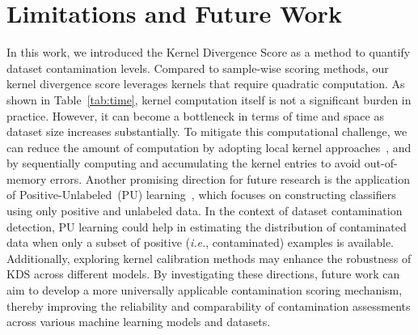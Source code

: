 \section{Limitations and Future Work}
\label{apdx:limits}

In this work, we introduced the Kernel Divergence Score as a method to quantify dataset contamination levels. Compared to sample-wise scoring methods, our kernel divergence score leverages kernels that require quadratic computation. 
As shown in Table~\ref{tab:time}, kernel computation itself is not a significant burden in practice.
However, it can become a bottleneck in terms of time and space as dataset size increases substantially. 
To mitigate this computational challenge, we can reduce the amount of computation by adopting local kernel approaches~\cite{segata2010fast}, and by sequentially computing and accumulating the kernel entries to avoid out-of-memory errors.
Another promising direction for future research is the application of Positive-Unlabeled~(PU) learning~\cite{elkan2008learning}, which focuses on constructing classifiers using only positive and unlabeled data.
In the context of dataset contamination detection, PU learning could help in estimating the distribution of contaminated data when only a subset of positive (\textit{i.e.}, contaminated) examples is available.
Additionally, exploring kernel calibration methods may enhance the robustness of KDS across different models. 
By investigating these directions, future work can aim to develop a more universally applicable contamination scoring mechanism, thereby improving the reliability and comparability of contamination assessments across various machine learning models and datasets.

